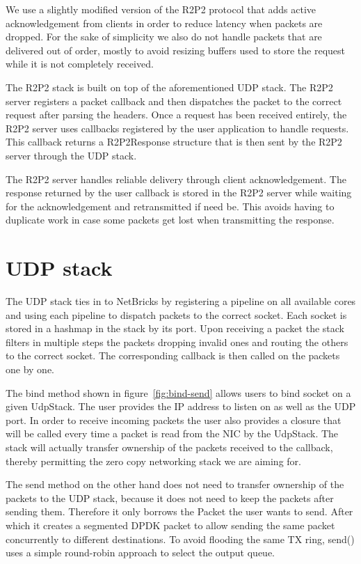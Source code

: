We use a slightly modified version of the R2P2 protocol that adds
active acknowledgement from clients in order to reduce latency when
packets are dropped. For the sake of simplicity we also do not handle
packets that are delivered out of order, mostly to avoid resizing
buffers used to store the request while it is not completely
received.

The R2P2 stack is built on top of the aforementioned UDP stack. The
R2P2 server registers a packet callback and then dispatches the packet
to the correct request after parsing the headers. Once a request has
been received entirely, the R2P2 server uses callbacks registered by
the user application to handle requests. This callback returns a
R2P2Response structure that is then sent by the R2P2 server through
the UDP stack.

The R2P2 server handles reliable delivery through client
acknowledgement. The response returned by the user callback is stored
in the R2P2 server while waiting for the acknowledgement and
retransmitted if need be. This avoids having to duplicate work in case
some packets get lost when transmitting the response.

\section{UDP stack}

The UDP stack ties in to NetBricks by registering a pipeline on all
available cores and using each pipeline to dispatch packets to the
correct socket. Each socket is stored in a hashmap in the stack by its
port. Upon receiving a packet the stack filters in multiple steps the
packets dropping invalid ones and routing the others to the correct
socket. The corresponding callback is then called on the packets one
by one.



The bind method shown in figure~\ref{fig:bind-send} allows users to
bind socket on a given UdpStack. The user provides the IP address to
listen on as well as the UDP port. In order to receive incoming
packets the user also provides a closure that will be called every
time a packet is read from the NIC by the UdpStack. The stack will
actually transfer ownership of the packets received to the callback,
thereby permitting the zero copy networking stack we are aiming for.

The send method on the other hand does not need to transfer ownership
of the packets to the UDP stack, because it does not need to keep the
packets after sending them. Therefore it only borrows the Packet the
user wants to send. After which it creates a segmented DPDK packet to
allow sending the same packet concurrently to different destinations.
To avoid flooding the same TX ring, send() uses a simple round-robin
approach to select the output queue.


